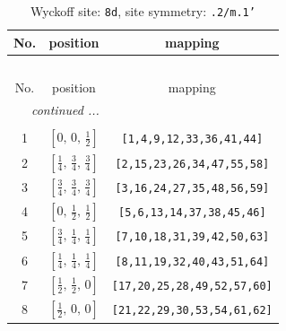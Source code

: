 \documentclass[fleqn,8pt]{jsarticle}
\begin{document}
\begin{longtable}{ccc}
\caption{Wyckoff site: {\tt 8d}, site symmetry: {\tt .2/m.1'}}
 \\
 \hline \hline
No. & position & mapping \\ \hline \endfirsthead

\multicolumn{2}{l}{\tablename\ \thetable{}} \\
 \hline \hline
No. & position & mapping \\ \hline \endhead

 \hline \hline
\multicolumn{2}{r}{\footnotesize\it continued ...} \\ \endfoot

 \hline \hline
\multicolumn{2}{r}{} \\ \endlastfoot

1 & $\left[ 0,\, 0,\, \frac{1}{2} \right]$ & {\tt [1,4,9,12,33,36,41,44]} \\ \hline
2 & $\left[ \frac{1}{4},\, \frac{3}{4},\, \frac{3}{4} \right]$ & {\tt [2,15,23,26,34,47,55,58]} \\ \hline
3 & $\left[ \frac{3}{4},\, \frac{3}{4},\, \frac{3}{4} \right]$ & {\tt [3,16,24,27,35,48,56,59]} \\ \hline
4 & $\left[ 0,\, \frac{1}{2},\, \frac{1}{2} \right]$ & {\tt [5,6,13,14,37,38,45,46]} \\ \hline
5 & $\left[ \frac{3}{4},\, \frac{1}{4},\, \frac{1}{4} \right]$ & {\tt [7,10,18,31,39,42,50,63]} \\ \hline
6 & $\left[ \frac{1}{4},\, \frac{1}{4},\, \frac{1}{4} \right]$ & {\tt [8,11,19,32,40,43,51,64]} \\ \hline
7 & $\left[ \frac{1}{2},\, \frac{1}{2},\, 0 \right]$ & {\tt [17,20,25,28,49,52,57,60]} \\ \hline
8 & $\left[ \frac{1}{2},\, 0,\, 0 \right]$ & {\tt [21,22,29,30,53,54,61,62]} \\
\end{longtable}
\renewcommand{\arraystretch}{1.2}
\end{document}
